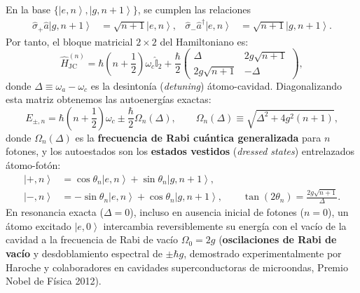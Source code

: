 \documentclass[11pt,a4paper,twoside]{report}
\theoremstyle{definition}
\theoremstyle{plain}
\theoremstyle{remark}
\newcommand{\ket}[1]{\left| #1 \right\rangle}
\newcommand{\op}[1]{\hat{#1}}
\newcommand{\ident}{\hat{\mathbb{I}}}
\begin{document}
En la base $\{\ket{e, n}, \ket{g, n+1}\}$, se cumplen las relaciones
\begin{align*}
    \op{\sigma}_+\op{a}\ket{g, n+1} &= \sqrt{n+1}\ket{e, n}, &
    \op{\sigma}_-\op{a}^\dagger\ket{e, n} &= \sqrt{n+1}\ket{g, n+1}.
\end{align*}
Por tanto, el bloque matricial $2\times 2$ del Hamiltoniano es:
\begin{equation}
    \op{H}_{\text{JC}}^{(n)} = \hbar\left(n + \frac{1}{2}\right)\omega_c \ident_2 + \frac{\hbar}{2}\begin{pmatrix} \Delta & 2g\sqrt{n+1} \\ 2g\sqrt{n+1} & -\Delta \end{pmatrix},
\end{equation}
donde $\Delta \equiv \omega_a - \omega_c$ es la desintonía (\textit{detuning}) átomo-cavidad. Diagonalizando esta matriz obtenemos las autoenergías exactas:
\begin{equation}
    E_{\pm, n} = \hbar\left(n + \frac{1}{2}\right)\omega_c \pm \frac{\hbar}{2}\Omega_n(\Delta), \qquad \Omega_n(\Delta) \equiv \sqrt{\Delta^2 + 4g^2(n+1)},
\end{equation}
donde $\Omega_n(\Delta)$ es la \textbf{frecuencia de Rabi cuántica generalizada} para $n$ fotones, y los autoestados son los \textbf{estados vestidos} (\textit{dressed states}) entrelazados átomo-fotón:
\begin{align}
    \ket{+, n} &= \cos\theta_n \ket{e, n} + \sin\theta_n \ket{g, n+1}, \\
    \ket{-, n} &= -\sin\theta_n \ket{e, n} + \cos\theta_n \ket{g, n+1}, \qquad \tan(2\theta_n) = \frac{2g\sqrt{n+1}}{\Delta}.
\end{align}
En resonancia exacta ($\Delta = 0$), incluso en ausencia inicial de fotones ($n = 0$), un átomo excitado $\ket{e, 0}$ intercambia reversiblemente su energía con el vacío de la cavidad a la frecuencia de Rabi de vacío $\Omega_0 = 2g$ (\textbf{oscilaciones de Rabi de vacío} y desdoblamiento espectral de $\pm\hbar g$, demostrado experimentalmente por Haroche y colaboradores en cavidades superconductoras de microondas, Premio Nobel de Física 2012).
\end{document}
